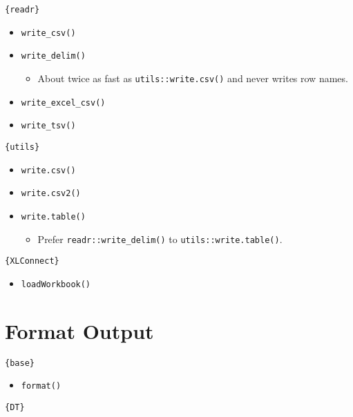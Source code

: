 \documentclass[
]{book}
\providecommand{\tightlist}{%
  \setlength{\itemsep}{0pt}\setlength{\parskip}{0pt}}
\begin{document}
\texttt{\{readr\}}

\begin{itemize}
\tightlist
\item
  \texttt{write\_csv()}
\item
  \texttt{write\_delim()}

  \begin{itemize}
  \tightlist
  \item
    About twice as fast as \texttt{utils::write.csv()} and never writes row names.
  \end{itemize}
\item
  \texttt{write\_excel\_csv()}
\item
  \texttt{write\_tsv()}
\end{itemize}

\texttt{\{utils\}}

\begin{itemize}
\tightlist
\item
  \texttt{write.csv()}
\item
  \texttt{write.csv2()}
\item
  \texttt{write.table()}

  \begin{itemize}
  \tightlist
  \item
    Prefer \texttt{readr::write\_delim()} to \texttt{utils::write.table()}.
  \end{itemize}
\end{itemize}

\texttt{\{XLConnect\}}

\begin{itemize}
\tightlist
\item
  \texttt{loadWorkbook()}
\end{itemize}

\hypertarget{format-output}{%
\section{Format Output}\label{format-output}}

\texttt{\{base\}}

\begin{itemize}
\tightlist
\item
  \texttt{format()}
\end{itemize}

\texttt{\{DT\}}
\end{document}

